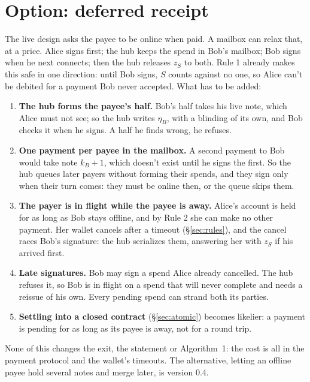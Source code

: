 \documentclass[11pt]{article}
\theoremstyle{plain}
\theoremstyle{definition}
\begin{document}
\section{Option: deferred receipt}\label{sec:deferred}

The live design asks the payee to be online when paid. A mailbox can
relax that, at a price. Alice signs first; the hub keeps the spend in
Bob's mailbox; Bob signs when he next connects; then the hub releases
$z_S$ to both. Rule 1 already makes this safe in one direction: until
Bob signs, $S$ counts against no one, so Alice can't be debited for a
payment Bob never accepted. What has to be added:

\begin{enumerate}[nosep]
\item \textbf{The hub forms the payee's half.} Bob's half takes his live
  note, which Alice must not see; so the hub writes $\eta_B$, with a
  blinding of its own, and Bob checks it when he signs. A half he finds
  wrong, he refuses.
\item \textbf{One payment per payee in the mailbox.} A second payment to
  Bob would take note $k_B + 1$, which doesn't exist until he signs the
  first. So the hub queues later payers without forming their spends,
  and they sign only when their turn comes: they must be online then,
  or the queue skips them.
\item \textbf{The payer is in flight while the payee is away.} Alice's
  account is held for as long as Bob stays offline, and by Rule 2 she
  can make no other payment. Her wallet cancels after a timeout
  (\S\ref{sec:rules}), and the cancel races Bob's signature: the hub
  serializes them, answering her with $z_S$ if his arrived first.
\item \textbf{Late signatures.} Bob may sign a spend Alice already
  cancelled. The hub refuses it, so Bob is in flight on a spend that
  will never complete and needs a reissue of his own. Every pending
  spend can strand both its parties.
\item \textbf{Settling into a closed contract} (\S\ref{sec:atomic})
  becomes likelier: a payment is pending for as long as its payee is
  away, not for a round trip.
\end{enumerate}

None of this changes the exit, the statement or Algorithm~1: the cost is
all in the payment protocol and the wallet's timeouts. The alternative,
letting an offline payee hold several notes and merge later, is version
0.4.
\end{document}
